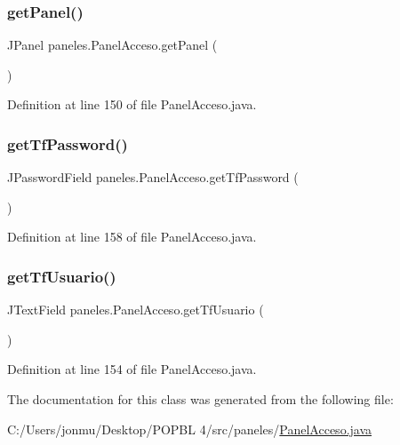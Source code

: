 \subsubsection{\texorpdfstring{get\+Panel()}{getPanel()}}
{\footnotesize\ttfamily J\+Panel paneles.\+Panel\+Acceso.\+get\+Panel (\begin{DoxyParamCaption}{ }\end{DoxyParamCaption})}



Definition at line 150 of file Panel\+Acceso.\+java.

\mbox{\label{classpaneles_1_1_panel_acceso_acff0ecd448fa0435276817069e088492}} 
\subsubsection{\texorpdfstring{get\+Tf\+Password()}{getTfPassword()}}
{\footnotesize\ttfamily J\+Password\+Field paneles.\+Panel\+Acceso.\+get\+Tf\+Password (\begin{DoxyParamCaption}{ }\end{DoxyParamCaption})}



Definition at line 158 of file Panel\+Acceso.\+java.

\mbox{\label{classpaneles_1_1_panel_acceso_a2e9e57df2c86935dcee9830931a7d3ec}} 
\subsubsection{\texorpdfstring{get\+Tf\+Usuario()}{getTfUsuario()}}
{\footnotesize\ttfamily J\+Text\+Field paneles.\+Panel\+Acceso.\+get\+Tf\+Usuario (\begin{DoxyParamCaption}{ }\end{DoxyParamCaption})}



Definition at line 154 of file Panel\+Acceso.\+java.



The documentation for this class was generated from the following file\+:\begin{DoxyCompactItemize}
\item 
C\+:/\+Users/jonmu/\+Desktop/\+P\+O\+P\+B\+L 4/src/paneles/\mbox{\hyperlink{_panel_acceso_8java}{Panel\+Acceso.\+java}}\end{DoxyCompactItemize}
